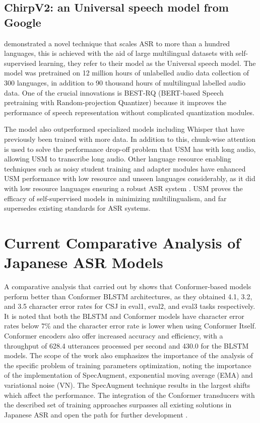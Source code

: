 \subsection{ChirpV2: an Universal speech model from Google}
\textcite{zhang2023google} demonstrated a novel technique that scales ASR to more than a hundred languages, this is achieved with the aid of large multilingual datasets with self-supervised learning, they refer to their model as the Universal speech model. The model was pretrained on 12 million hours of unlabelled audio data collection of 300 languages, in addition to 90 thousand hours of multilingual labelled audio data. One of the crucial innovations is BEST-RQ (BERT-based Speech pretraining with Random-projection Quantizer) because it improves the performance of speech representation without complicated quantization modules. 

The model also outperformed specialized models including Whisper that have previously been trained with more data. In addition to this, chunk-wise attention is used to solve the performance drop-off problem that USM has with long audio, allowing USM to transcribe long audio. Other language resource enabling techniques such as noisy student training and adapter modules have enhanced USM performance with low resource and unseen languages considerably, as it did with low resource languages ensuring a robust ASR system \parencite{zhang2023google}. USM proves the efficacy of self-supervised models in minimizing multilingualism, and far supersedes existing standards for ASR systems.

\section{Current Comparative Analysis of Japanese ASR Models}
A comparative analysis that carried out by \textcite{karita2021comparative} shows that Conformer-based models perform better than Conformer BLSTM architectures, as they obtained 4.1, 3.2, and 3.5 character error rates for CSJ in eval1, eval2, and eval3 tasks respectively. It is noted that both the BLSTM and Conformer models have character error rates below 7\% and the character error rate is lower when using Conformer Itself. Conformer encoders also offer increased accuracy and efficiency, with a throughput of 628.4 utterances processed per second and 430.0 for the BLSTM models. The scope of the work also emphasizes the importance of the analysis of the specific problem of training parameters optimization, noting the importance of the implementation of SpecAugment, exponential moving average (EMA) and variational noise (VN). The SpecAugment technique results in the largest shifts which affect the performance. The integration of the Conformer transducers with the described set of training approaches surpasses all existing solutions in Japanese ASR and open the path for further development \parencite{karita2021comparative}.

